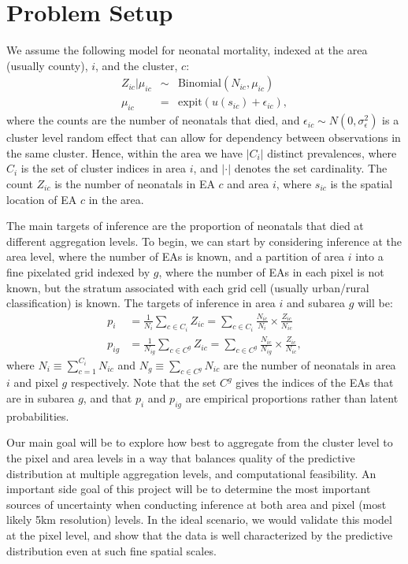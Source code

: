 \documentclass[12pt]{article}
\begin{document}
\section{Problem Setup}

We assume the following model for neonatal mortality, indexed at the area (usually county), $i$, and the cluster, $c$:
\begin{eqnarray}
Z_{ic} | \mu_{ic}& \sim& \mbox{Binomial}(N_{ic}, \mu_{ic}) \label{eq:model1}\\
\mu_{ic} &=& \mbox{expit}(u(s_{ic}) + \epsilon_{ic}), \label{eq:model2}
\end{eqnarray}
where the counts are the number of neonatals that died, and $\epsilon_{ic} \sim N(0,\sigma_\epsilon^2)$ is a cluster level random effect that can allow for dependency between observations in the same cluster. Hence, within the area we have $|C_{i}|$ distinct prevalences, where $C_{i}$ is the set of cluster indices in area $i$, and $|\cdot|$ denotes the set cardinality. The count $Z_{ic}$ is the number of neonatals in EA $c$ and area $i$, where $s_{ic}$ is the spatial location of EA $c$ in the area.

The main targets of inference are the proportion of neonatals that died at different aggregation levels.  To begin, we can start by considering inference at the area level, where the number of EAs is known, and a partition of area $i$ into a fine pixelated grid indexed by $g$, where the number of EAs in each pixel is not known, but the stratum associated with each grid cell (usually urban/rural classification) is known.  The targets of inference in area $i$ and subarea $g$ will be: 
\begin{align}
p_i &= \frac{1}{N_i} \sum_{c \in C_{i}} Z_{ic} = \sum_{c \in C_{i}} \frac{N_{ic}}{N_i}  \times \frac{Z_{ic}}{N_{ic}} \label{eq:pi} \\
p_{ig} &= \frac{1}{N_{ig}} \sum_{c \in C^g} Z_{ic} = \sum_{c \in C^g} \frac{N_{ic}}{N_{ig}}  \times \frac{Z_{ic}}{N_{ic}}  , \label{eq:pig}
\end{align}
where $N_i \equiv \sum_{c=1}^{C_{i}} N_{ic}$ and $N_{g} \equiv \sum_{c \in C^g} N_{ic}$ are the number of neonatals in area $i$ and pixel $g$ respectively. Note that the set $C^g$ gives the indices of the EAs that are in subarea $g$, and that $p_i$ and $p_{ig}$ are empirical proportions rather than latent probabilities.

Our main goal will be to explore how best to aggregate from the cluster level to the pixel and area levels in a way that balances quality of the predictive distribution at multiple aggregation levels, and computational feasibility. An important side goal of this project will be to determine the most important sources of uncertainty when conducting inference at both area and pixel (most likely 5km resolution) levels. In the ideal scenario, we would validate this model at the pixel level, and show that the data is well characterized by the predictive distribution even at such fine spatial scales.
\end{document}
